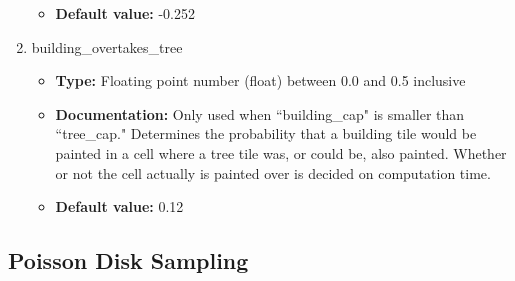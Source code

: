 \begin{enumerate}
\begin{itemize}
        \item \textbf{Default value:} -0.252
    \end{itemize}
    \item building\_overtakes\_tree
    \begin{itemize}
        \item \textbf{Type:} Floating point number (float) between 0.0 and 0.5 inclusive
        \item \textbf{Documentation:} Only used when ``building\_cap" is smaller than ``tree\_cap." Determines the probability that a building tile would be painted in a cell where a tree tile was, or could be, also painted. Whether or not the cell actually is painted over is decided on computation time.
        \item \textbf{Default value:} 0.12
    \end{itemize}
\end{enumerate}

\subsection{Poisson Disk Sampling}

